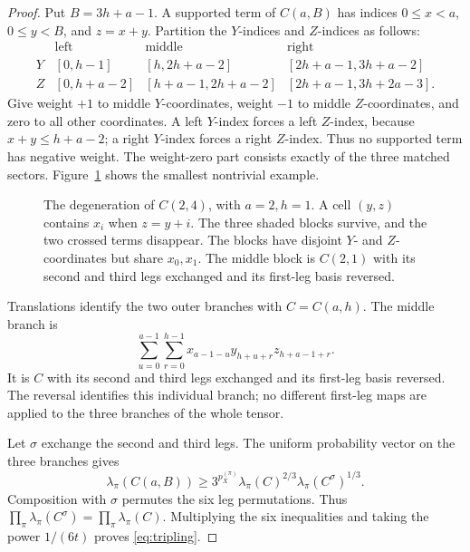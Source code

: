 \documentclass[11pt]{article}
\theoremstyle{definition}
\theoremstyle{remark}
\numberwithin{equation}{section}
\begin{document}
\begin{proof}
Put $B=3h+a-1$. A supported term of $C(a,B)$ has indices
$0\leq x<a$, $0\leq y<B$, and $z=x+y$.
Partition the $Y$-indices and $Z$-indices as follows:
\[
\begin{array}{c|ccc}
 &\text{left}&\text{middle}&\text{right}\\ \hline
 Y &[0,h-1]&[h,2h+a-2]&[2h+a-1,3h+a-2]\\
 Z &[0,h+a-2]&[h+a-1,2h+a-2]&[2h+a-1,3h+2a-3].
\end{array}
\]
Give weight $+1$ to middle $Y$-coordinates, weight $-1$ to middle
$Z$-coordinates, and zero to all other coordinates. A left $Y$-index
forces a left $Z$-index, because $x+y\leq h+a-2$; a right $Y$-index
forces a right $Z$-index. Thus no supported term has negative weight.
The weight-zero part consists exactly of the three matched sectors.
Figure~\ref{fig:tripling} shows the smallest nontrivial example.

\begin{figure}[tb]
\centering
{}
\caption{The degeneration of $C(2,4)$, with $a=2,h=1$.
A cell $(y,z)$ contains $x_i$ when $z=y+i$. The three shaded
blocks survive, and the two crossed terms disappear. The blocks
have disjoint $Y$- and $Z$-coordinates but share $x_0,x_1$.
The middle block is $C(2,1)$ with its second and third legs exchanged
and its first-leg basis reversed.}
\label{fig:tripling}
\end{figure}

Translations identify the two outer branches with $C=C(a,h)$.
The middle branch is
\[
 \sum_{u=0}^{a-1}\sum_{r=0}^{h-1}
 x_{a-1-u}y_{h+u+r}z_{h+a-1+r}.
\]
It is $C$ with its second and third legs exchanged and its first-leg
basis reversed. The reversal identifies this individual branch;
no different first-leg maps are applied to the three branches of
the whole tensor.

Let $\sigma$ exchange the second and third legs. The uniform
probability vector on the three branches gives
\[
 \lambda_\pi(C(a,B))\geq
 3^{p_X^{(\pi)}}\lambda_\pi(C)^{2/3}
                       \lambda_\pi(C^\sigma)^{1/3}.
\]
Composition with $\sigma$ permutes the six leg permutations. Thus
$\prod_\pi\lambda_\pi(C^\sigma)=\prod_\pi\lambda_\pi(C)$.
Multiplying the six inequalities and taking the power $1/(6t)$
proves \eqref{eq:tripling}.
\end{proof}
\end{document}
